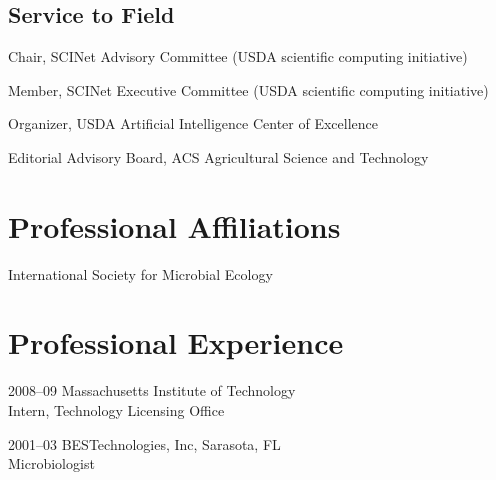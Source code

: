 \documentclass[12pt,letterpaper]{report}
\newcommand{\listitemspace}{0.15em}
\renewenvironment{itemize}
{\begin{list}{}{\setlength{\leftmargin}{0em}
            \setlength{\parskip}{0em}
            \setlength{\itemsep}{\listitemspace}
            \setlength{\parsep}{\listitemspace}}}
    {\end{list}}
\begin{document}
    \subsection*{Service to Field}

    \begin{itemize}

        \item Chair, SCINet Advisory Committee (USDA scientific computing initiative)      
        \item Member, SCINet Executive Committee (USDA scientific computing initiative)
        \item Organizer, USDA Artificial Intelligence  Center of Excellence
        \item Editorial Advisory Board,  ACS Agricultural Science and Technology


    \end{itemize}





    \section*{Professional Affiliations}

    \begin{itemize}

        \item International Society for Microbial Ecology

    \end{itemize}



    \section*{Professional Experience}

    \begin{tablist}

        \item[2008--09] \tab Massachusetts Institute of Technology \\
        			    Intern, Technology Licensing Office
			    
	\item[2001--03] \tab BESTechnologies, Inc, Sarasota, FL \\
				Microbiologist	

    \end{tablist}
\end{document}
